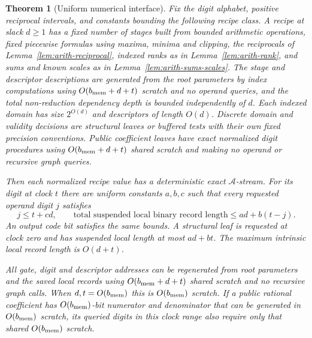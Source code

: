 \documentclass[11pt]{article}
\numberwithin{equation}{section}
\newtheorem{theorem}{Theorem}[section]
\theoremstyle{definition}
\theoremstyle{remark}
\begin{document}
\begin{theorem}[Uniform numerical interface]
\label{thm:arith-interface}
Fix the digit alphabet, positive reciprocal intervals, and
constants bounding the following recipe class.  A recipe at
slack $d\geq1$ has a fixed number of stages built from bounded
arithmetic operations, fixed piecewise formulas using maxima,
minima and clipping, the reciprocals of
Lemma~\ref{lem:arith-reciprocal}, indexed ranks as in
Lemma~\ref{lem:arith-rank}, and sums and known scales as in
Lemma~\ref{lem:arith-sums-scales}.  The stage and descriptor
descriptions are generated from the root parameters by index
computations using $O({b_{\rm mem}}+d+t)$ scratch and no operand queries, and the
total non-reduction dependency depth is bounded independently
of $d$.  Each indexed domain has size $2^{O(d)}$ and descriptors
of length $O(d)$.  Discrete domain and validity decisions are
structural leaves or buffered tests with their own fixed
precision conventions.  Public coefficient leaves have exact
normalized digit procedures using $O({b_{\rm mem}}+d+t)$ shared scratch
and making no operand or recursive graph queries.

Then each normalized recipe value has a deterministic exact
$\mathcal A$-stream.  For its digit at clock $t$ there are uniform
constants $a,b,c$ such that every requested operand digit $j$
satisfies
\begin{equation}
 j\leq t+cd,\qquad
 \text{total suspended local binary record length}
       \leq ad+b(t-j).
 \label{eq:arith-export}
\end{equation}
An output code bit satisfies the same bounds.  A structural leaf
is requested at clock zero and has suspended local length at
most $ad+bt$.  The maximum intrinsic local record length is
$O(d+t)$.

All gate, digit and descriptor addresses can be regenerated from
root parameters and the saved local records using
$O({b_{\rm mem}}+d+t)$ shared scratch and no recursive graph calls.  When
$d,t=O({b_{\rm mem}})$ this is $O({b_{\rm mem}})$ scratch.  If a public rational
coefficient has $O({b_{\rm mem}})$-bit numerator and denominator that can
be generated in $O({b_{\rm mem}})$ scratch, its queried digits in this clock
range also require only that shared $O({b_{\rm mem}})$ scratch.
\end{theorem}
\end{document}
